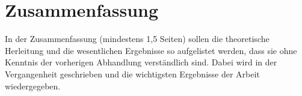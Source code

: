 \chapter{Zusammenfassung}

In der Zusammenfassung (mindestens 1,5 Seiten) sollen die theoretische Herleitung
und die wesentlichen Ergebnisse so aufgelistet werden, dass sie ohne Kenntnis der
vorherigen Abhandlung verständlich sind. Dabei wird in der Vergangenheit geschrieben und die wichtigsten Ergebnisse
der Arbeit wiedergegeben.